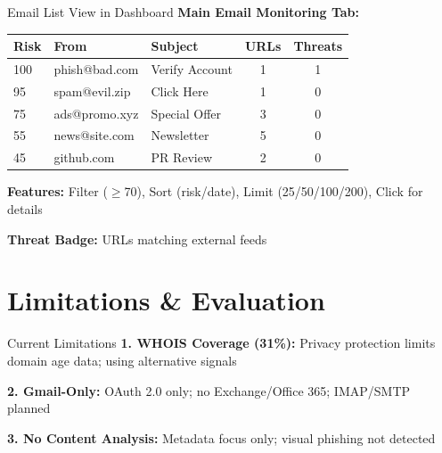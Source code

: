 \documentclass[aspectratio=169]{beamer}
\begin{document}
\begin{frame}{Email List View in Dashboard}
\vspace{-0.4cm}
\small
\textbf{Main Email Monitoring Tab:}

\vspace{0.0cm}
\begin{center}
\scriptsize
\begin{tabular}{lllcc}
\toprule
\textbf{Risk} & \textbf{From} & \textbf{Subject} & \textbf{URLs} & \textbf{Threats} \\
\midrule
\textcolor{criticalred}{100} & phish@bad.com & Verify Account & 1 & 1 \\
\textcolor{criticalred}{95} & spam@evil.zip & Click Here & 1 & 0 \\
\textcolor{highorange}{75} & ads@promo.xyz & Special Offer & 3 & 0 \\
\textcolor{mediumyellow}{55} & news@site.com & Newsletter & 5 & 0 \\
\textcolor{lowgreen}{45} & github.com & PR Review & 2 & 0 \\
\bottomrule
\end{tabular}
\end{center}

\vspace{0.1cm}
\scriptsize
\textbf{Features:} Filter ($\geq$70), Sort (risk/date), Limit (25/50/100/200), Click for details

\textbf{Threat Badge:} URLs matching external feeds
\end{frame}

\section{Limitations \& Evaluation}

\begin{frame}{Current Limitations}
\vspace*{-0.3cm}
\scriptsize
\textbf{1. WHOIS Coverage (31\%):} Privacy protection limits domain age data; using alternative signals

\vspace{0.1cm}
\textbf{2. Gmail-Only:} OAuth 2.0 only; no Exchange/Office 365; IMAP/SMTP planned

\vspace{0.1cm}
\textbf{3. No Content Analysis:} Metadata focus only; visual phishing not detected
\end{frame}
\end{document}
